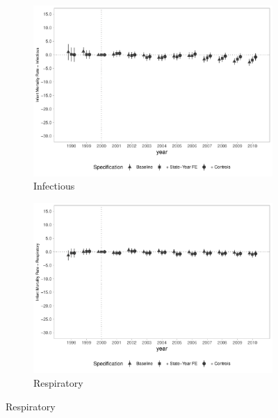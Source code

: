 \begin{figure}[h]
    \begin{center}
    \caption{Causal Effects on Infant Mortality Rates - By Cause}\label{fig:imr3}
    \begin{subfigure}{0.32\textwidth}
        \caption{\scriptsize Infectious}\label{fig:imr3_a}
        \centering
        \includegraphics[width=\textwidth]{plots/IMR/tx_mi_infec_dist_ec29_baseline_dist_ec29_baseline_full.pdf}
    \end{subfigure}
    \begin{subfigure}{0.32\textwidth}
        \centering
        \caption{\scriptsize Respiratory}\label{fig:imr3_b}
        \includegraphics[width=\textwidth]{plots/IMR/tx_mi_resp_dist_ec29_baseline_dist_ec29_baseline_full.pdf}
    \end{subfigure}

\end{center}
\end{figure}
